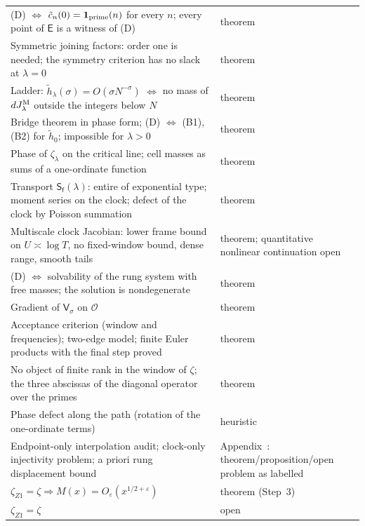 \documentclass[11pt,reqno]{amsart}
\makeatletter
\let\CG@origref\ref
\newcommand{\CG@gettip}[1]{\@ifundefined{CGTip@#1}{Reference: #1}{\csname CGTip@#1\endcsname}}
\DeclareRobustCommand{\CGref}[1]{\pdftooltip{\CG@origref{#1}}{\CG@gettip{#1}}}
\numberwithin{equation}{section}
\theoremstyle{plain}
\theoremstyle{definition}
\theoremstyle{remark}
\newcommand{\eps}{\varepsilon}
\makeatother
\begin{document}
\begin{longtable}{p{}p{}}
(D) $\Leftrightarrow$ $\tilde c_n(0)=\mathbf 1_{\rm prime}(n)$ for every $n$; every point of $\mathsf E$ is a witness of (D) & theorem\\
Symmetric joining factors: order one is needed; the symmetry criterion has no slack at $\lambda=0$ & theorem\\
Ladder: $\tilde h_\lambda(\sigma)=O(\sigma N^{-\sigma})$ $\Leftrightarrow$ no mass of $dJ^{\rm M}_\lambda$ outside the integers below $N$ & theorem\\
Bridge theorem in phase form; (D) $\Leftrightarrow$ \textup{(B1)}, \textup{(B2)} for $\tilde h_0$; impossible for $\lambda>0$ & theorem\\
Phase of $\zeta_\lambda$ on the critical line; cell masses as sums of a one-ordinate function & theorem\\
Transport $\mathsf S_{\mathsf f}(\lambda)$: entire of exponential type; moment series on the clock; defect of the clock by Poisson summation & theorem\\
Multiscale clock Jacobian: lower frame bound on $U\asymp\log T$, no fixed-window bound, dense range, smooth tails & theorem; quantitative nonlinear continuation open\\
(D) $\Leftrightarrow$ solvability of the rung system with free masses; the solution is nondegenerate & theorem\\
Gradient of $\mathsf V_\sigma$ on $\mathscr O$ & theorem\\
Acceptance criterion (window and frequencies); two-edge model; finite Euler products with the final step proved & theorem\\
No object of finite rank in the window of $\zeta$; the three abscissas of the diagonal operator over the primes & theorem\\
Phase defect along the path (rotation of the one-ordinate terms) & heuristic\\
Endpoint-only interpolation audit; clock-only injectivity problem; a priori rung displacement bound & Appendix~\CGref{sec:appendix-endpoint-v18}: theorem/proposition/open problem as labelled\\
$\zeta_{Z1}=\zeta\Rightarrow M(x)=O_\eps(x^{1/2+\eps})$ & theorem (Step~3)\\
$\zeta_{Z1}=\zeta$ & open\\
\end{longtable}
\endgroup
\end{document}
